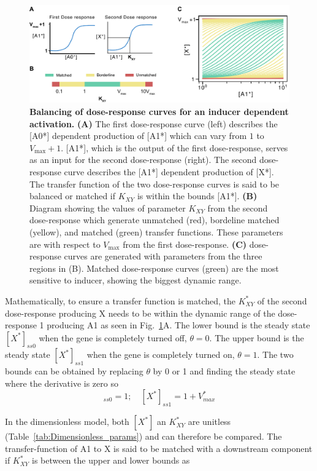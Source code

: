 \begin{figure}[H]
    \centering
    \includegraphics[width=1\textwidth]{chapters/Chapter 2/balancing}
    \caption{\textbf{Balancing of dose-response curves for an inducer dependent activation.} \textbf{(A)} The first dose-response curve (left) describes the [A0*] dependent production of [A1*] which can vary from $1$ to $V_{\max}+1 $. [A1*], which is the output of the first dose-response, serves as an input for the second dose-response (right). The second dose-response curve describes the [A1*] dependent production of [X*]. The transfer function of the two dose-response curves is said to be balanced or matched if $K_{XY}$ is within the bounds [A1*]. \textbf{(B)} Diagram showing the values of parameter $K_{XY}$ from the second dose-response which generate unmatched (red), bordeline matched (yellow), and matched (green) transfer functions. These parameters are with respect to $V_{\max}$ from the first dose-response. \textbf{(C)} dose-response curves are generated with parameters from the three regions in (B). Matched dose-response curves (green) are the most sensitive to inducer, showing the biggest dynamic range.}
    \label{fig:balancing}
\end{figure}


Mathematically, to ensure a transfer function is matched,
the $K^*_{XY}$ of the second dose-response producing X needs
to be within the dynamic range of the dose-response 1 producing A1 as seen in Fig.~\ref{fig:balancing}A.
The lower bound is the steady state $[X^*]_{ss0}$ when the gene is completely turned off, $\theta=0$.
The upper bound is the steady state $[X^*]_{ss1}$ when the gene is completely turned on, $\theta=1$.
The two bounds can be obtained
by replacing $\theta$ by 0 or 1 and finding the steady state where the derivative is zero so
\begin{equation}
    [X^*]_{ss0}=1; \quad [X^*]_{ss1}=1+V^*_{max}
    \label{1toVmax}
\end{equation}


In the dimensionless model,
both $[X^*]$ an $K^*_{XY}$ are unitless (Table~\ref{tab:Dimensionless_params}) and can therefore be compared.
The transfer-function of A1 to X is said
to be matched with a downstream component if $K^*_{XY}$ is between the upper and lower bounds as


